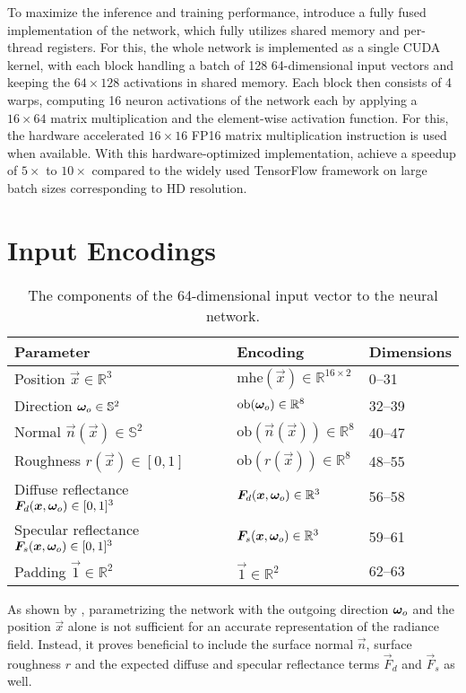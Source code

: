 To maximize the inference and training performance, \textcite{muller2021} introduce a fully fused implementation of the network, which fully utilizes shared memory and per-thread registers.
For this, the whole network is implemented as a single CUDA kernel, with each block handling a batch of 128 64-dimensional input vectors and keeping the $64\times128$ activations in shared memory.
Each block then consists of 4 warps, computing 16 neuron activations of the network each by applying a $16\times64$ matrix multiplication and the element-wise activation function.
For this, the hardware accelerated $16\times16$ FP16 matrix multiplication instruction is used when available.
With this hardware-optimized implementation, \textcite{muller2021} achieve a speedup of $5\times$ to $10\times$ compared to the widely used TensorFlow framework \parencite{tensorflowdevelopers2021} on large batch sizes corresponding to HD resolution.

\section{Input Encodings}
\begin{table}
    \centering
    \begin{tabular}{l l l}
        \textbf{Parameter} & \textbf{Encoding} & \textbf{Dimensions} \\
        \midrule
        Position $\vec{x} \in \mathbb{R}^3$ & $\mathrm{mhe}(\vec{x}) \in \mathbb{R}^{16 \times 2}$ & 0--31 \\
        Direction ${\bm{\omega}_o} \in \mathbb{S}^2$ & $\mathrm{ob}({\bm{\omega}_o}) \in \mathbb{R}^{8}$ & 32--39 \\
        Normal $\vec{n}(\vec{x}) \in \mathbb{S}^2$ & $\mathrm{ob}(\vec{n}(\vec{x})) \in \mathbb{R}^{8}$ & 40--47 \\
        Roughness $r(\vec{x}) \in [0,1]$ & $\mathrm{ob}(r(\vec{x})) \in \mathbb{R}^{8}$ & 48--55 \\
        Diffuse reflectance $\bm{F}_d(\bm{x}, {\bm{\omega}_o}) \in [0,1]^3$ & $\bm{F}_d(\bm{x}, {\bm{\omega}_o}) \in \mathbb{R}^{3}$ & 56--58 \\
        Specular reflectance $\bm{F}_s(\bm{x}, {\bm{\omega}_o}) \in [0,1]^3$ & $\bm{F}_s(\bm{x}, {\bm{\omega}_o}) \in \mathbb{R}^{3}$ & 59--61 \\
        Padding $\vec{1} \in \mathbb{R}^2$ & $\vec{1} \in \mathbb{R}^2$ & 62--63 \\ %
    \end{tabular}
    \caption{The components of the 64-dimensional input vector to the neural network.}
    \label{tab:input-encoding}
\end{table}
As shown by \textcite{ren2013}, parametrizing the network with the outgoing direction ${\bm{\omega}_o}$ and the position $\vec{x}$ alone is not sufficient for an accurate representation of the radiance field.
Instead, it proves beneficial to include the surface normal $\vec{n}$, surface roughness $r$ and the expected diffuse and specular reflectance terms $\vec{F}_d$ and $\vec{F}_s$ as well.

